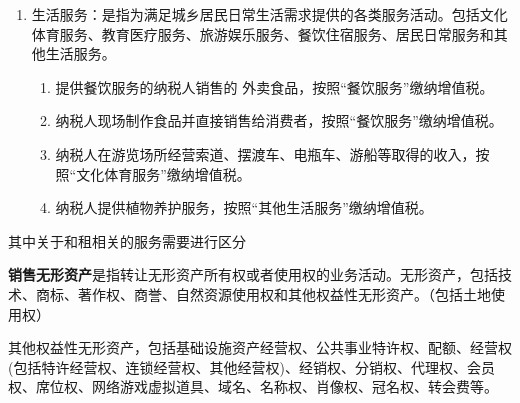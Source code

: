 \documentclass[UTF8,12pt]{ctexart}
\numberwithin{equation}{section} %
\numberwithin{figure}{section}
\numberwithin{table}{section}
\begin{document}
\begin{enumerate}
\begin{enumerate}
			\item 翻译服务和市场调查服务，应按照咨询服务缴纳增值税。
			
			\item 企业管理服务、经纪代理服务、人力资源服务、安全保护服务，都属于商务辅助服务。武装守护押运服务按照“安全保护服务”缴纳增值税。
			
			\item 拍卖行受托拍卖取得的手续费或佣金收入，按照“经纪代理服务”缴纳增值税。
			
			\item 货运客运场站服务、打捞救助服务、装卸搬运服务、仓储服务和收派服务，属于物流辅助服务。
			
			\item 纳税人为客户办理退票而向客户收取的 退票费、手续费等收入，按照“其他现代服务”缴纳增值税。
			
			\item 纳税人对安装运行后的机器设备提供的维护保养服务，按照“其他现代服务”缴纳增值税。
		\end{enumerate}
		
		\item 生活服务：是指为满足城乡居民日常生活需求提供的各类服务活动。包括文化体育服务、教育医疗服务、旅游娱乐服务、餐饮住宿服务、居民日常服务和其他生活服务。
		\begin{enumerate}
			\item 提供餐饮服务的纳税人销售的 外卖食品，按照“餐饮服务”缴纳增值税。
			
			\item 纳税人现场制作食品并直接销售给消费者，按照“餐饮服务”缴纳增值税。
			
			\item 纳税人在游览场所经营索道、摆渡车、电瓶车、游船等取得的收入，按照“文化体育服务”缴纳增值税。
			
			\item 纳税人提供植物养护服务，按照“其他生活服务”缴纳增值税。
		\end{enumerate}
	\end{enumerate}
	
	其中关于和租相关的服务需要进行区分
	
	
	\textbf{销售无形资产}是指转让无形资产所有权或者使用权的业务活动。无形资产，包括技术、商标、著作权、商誉、自然资源使用权和其他权益性无形资产。（包括土地使用权）
	
	其他权益性无形资产，包括基础设施资产经营权、公共事业特许权、配额、经营权(包括特许经营权、连锁经营权、其他经营权)、经销权、分销权、代理权、会员权、席位权、网络游戏虚拟道具、域名、名称权、肖像权、冠名权、转会费等。
	
\end{document}

